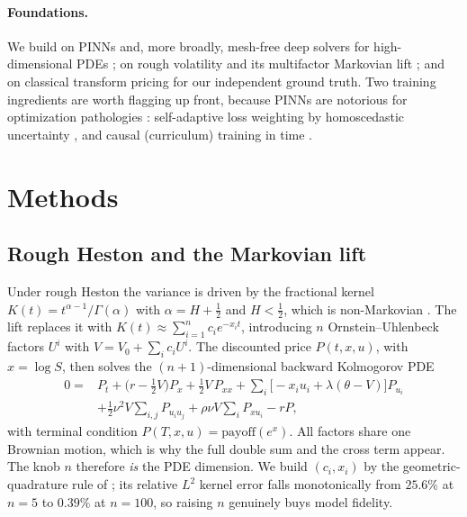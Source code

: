 \documentclass[11pt]{article}
\begin{document}
\paragraph{Foundations.} We build on PINNs \citep{raissi2019physics} and, more
broadly, mesh-free deep solvers for high-dimensional PDEs
\citep{sirignano2018dgm,han2018solving}; on rough volatility
\citep{gatheral2018volatility,eleuch2019characteristic} and its multifactor
Markovian lift \citep{abijaber2019multifactor,abijaber2019lifting}; and on
classical transform pricing \citep{heston1993closed,carr1999option} for our
independent ground truth. Two training ingredients are worth flagging up front,
because PINNs are notorious for optimization pathologies
\citep{krishnapriyan2021characterizing,wang2022when}: self-adaptive loss weighting
by homoscedastic uncertainty \citep{kendall2018multitask,mcclenny2023self}, and
causal (curriculum) training in time \citep{wang2024respecting}.

\section{Methods}

\subsection{Rough Heston and the Markovian lift}
Under rough Heston the variance is driven by the fractional kernel
$K(t)=t^{\alpha-1}/\Gamma(\alpha)$ with $\alpha=H+\tfrac12$ and $H<\tfrac12$,
which is non-Markovian \citep{gatheral2018volatility,eleuch2019characteristic}.
The lift \citep{abijaber2019multifactor,abijaber2019lifting} replaces it with
$K(t)\approx\sum_{i=1}^{n}c_i e^{-x_i t}$, introducing $n$ Ornstein--Uhlenbeck
factors $U^i$ with $V=V_0+\sum_i c_i U^i$. The discounted price $P(t,x,u)$, with
$x=\log S$, then solves the $(n{+}1)$-dimensional backward Kolmogorov PDE
\begin{align}
0 = {}& P_t + \Big(r-\tfrac12 V\Big)P_x + \tfrac12 V\,P_{xx}
   + \sum_i\big[-x_i u_i + \lambda(\theta-V)\big]P_{u_i} \nonumber\\
   & + \tfrac12\nu^2 V\sum_{i,j}P_{u_i u_j}
   + \rho\nu V\sum_i P_{x u_i} - rP,
\label{eq:pde}
\end{align}
with terminal condition $P(T,x,u)=\mathrm{payoff}(e^{x})$. All factors share one
Brownian motion, which is why the full double sum and the cross term appear. The
knob $n$ therefore \emph{is} the PDE dimension. We build $(c_i,x_i)$ by the
geometric-quadrature rule of \citet{abijaber2019multifactor}; its relative $L^2$
kernel error falls monotonically from $25.6\%$ at $n=5$ to $0.39\%$ at $n=100$, so
raising $n$ genuinely buys model fidelity.
\end{document}
